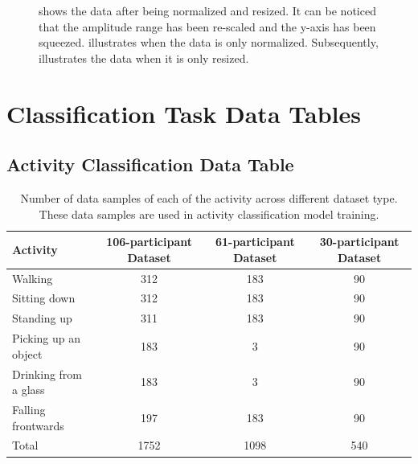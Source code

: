 \documentclass{l4proj}
\begin{document}
\begin{appendices}
\begin{figure}[h]
  \caption{ shows the data after being normalized and resized. It can be noticed that the amplitude range has been re-scaled and the y-axis has been squeezed.  illustrates when the data is only normalized. Subsequently,  illustrates the data when it is only resized.}
  \label{fig:Normalized Resized Comparison Plots}
\end{figure}

\newpage

\section{Classification Task Data Tables}

\subsection{Activity Classification Data Table}
\begin{table}[h]
    \centering
    \begin{tabular}{|l|c|c|c|}
        \hline
        \rowcolor{lightgray}
        \textbf{Activity} & \textbf{106-participant Dataset} & \textbf{61-participant Dataset} & \textbf{30-participant Dataset}\\
        \hline
        Walking & 312 & 183 & 90\\
        \hline
        Sitting down & 312 & 183 & 90\\
        \hline
        Standing up & 311 & 183 & 90\\
        \hline
        Picking up an object & 183 & 3 & 90\\
        \hline
        Drinking from a glass & 183 & 3 & 90\\
        \hline
        Falling frontwards & 197 & 183 & 90\\
        \hline
        Total & 1752 & 1098 & 540\\
        \hline
    \end{tabular}
    \caption{Number of data samples of each of the activity across different dataset type. These data samples are used in activity classification model training.}
    \label{tab:activity-classification-number-of-samples}
\end{table}


\end{appendices}
\end{document}
